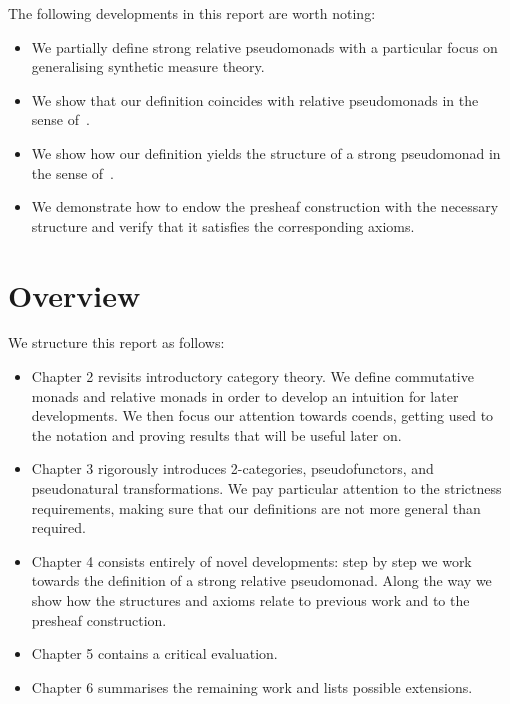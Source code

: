 The following developments in this report are worth noting:

\begin{itemize}
  \item We partially define strong relative pseudomonads with a particular 
    focus on generalising synthetic measure theory.
  \item We show that our definition coincides with relative pseudomonads
    in the sense of~\cite{fiore2017}.
  \item We show how our definition yields the structure of a strong
    pseudomonad in the sense of~\cite{saville2023}.
  \item We demonstrate how to endow the presheaf construction with the
    necessary structure and verify that it satisfies the corresponding
    axioms.
\end{itemize}

\section{Overview}

We structure this report as follows:
\begin{itemize}
  \item Chapter 2 revisits introductory category theory. We define commutative
    monads and relative monads in order to develop an intuition for later
    developments. We then focus our attention towards coends, getting used to
    the notation and proving results that will be useful later on.
  \item Chapter 3 rigorously introduces 2-categories, pseudofunctors, and
    pseudonatural transformations. We pay particular attention to the strictness
    requirements, making sure that our definitions are not more general than required.
  \item Chapter 4 consists entirely of novel developments: step by step we work towards
    the definition of a strong relative pseudomonad. Along the way we show how the
    structures and axioms relate to previous work and to the presheaf construction.
  \item Chapter 5 contains a critical evaluation.
  \item Chapter 6 summarises the remaining work and lists possible extensions.
\end{itemize}


